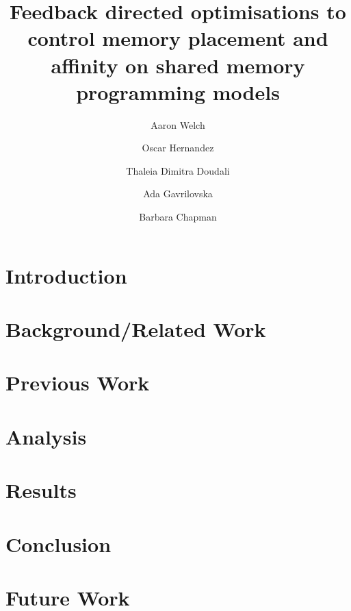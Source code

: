 \documentclass{ieeeconf}
\begin{document}
\title{Feedback directed optimisations to control memory placement and affinity on shared memory programming models}
\author[1, 2]{Aaron Welch}
\author[1]{Oscar Hernandez}
\author[3]{Thaleia Dimitra Doudali}
\author[3]{Ada Gavrilovska}
\author[2]{Barbara Chapman}

\maketitle
\begin{abstract}

\end{abstract}
\section{Introduction}
\label{sec:intro}

\section{Background/Related Work}
\label{sec:background}

\section{Previous Work}
\label{sec:prevwork}

\section{Analysis}
\label{sec:analysis}

\section{Results}
\label{sec:results}

\section{Conclusion}
\label{sec:conclusion}

\section{Future Work}
\label{sec:future}



\end{document}
